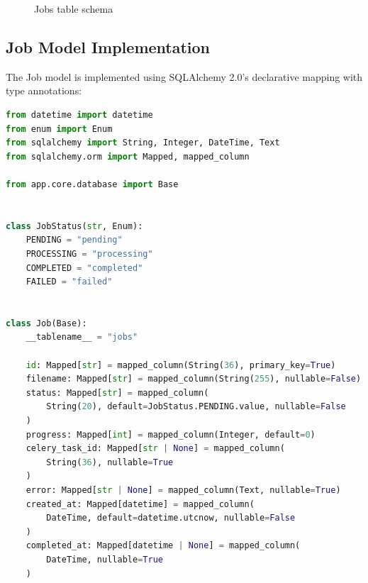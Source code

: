 \begin{figure}[H]
\centering
{}
\caption{Jobs table schema}
\label{fig:db-schema}
\end{figure}

\subsection{Job Model Implementation}

The Job model is implemented using SQLAlchemy 2.0's declarative mapping with type annotations:

\begin{lstlisting}[language=Python, caption={Job model definition (app/models/job.py)}]
from datetime import datetime
from enum import Enum
from sqlalchemy import String, Integer, DateTime, Text
from sqlalchemy.orm import Mapped, mapped_column

from app.core.database import Base


class JobStatus(str, Enum):
    PENDING = "pending"
    PROCESSING = "processing"
    COMPLETED = "completed"
    FAILED = "failed"


class Job(Base):
    __tablename__ = "jobs"

    id: Mapped[str] = mapped_column(String(36), primary_key=True)
    filename: Mapped[str] = mapped_column(String(255), nullable=False)
    status: Mapped[str] = mapped_column(
        String(20), default=JobStatus.PENDING.value, nullable=False
    )
    progress: Mapped[int] = mapped_column(Integer, default=0)
    celery_task_id: Mapped[str | None] = mapped_column(
        String(36), nullable=True
    )
    error: Mapped[str | None] = mapped_column(Text, nullable=True)
    created_at: Mapped[datetime] = mapped_column(
        DateTime, default=datetime.utcnow, nullable=False
    )
    completed_at: Mapped[datetime | None] = mapped_column(
        DateTime, nullable=True
    )
\end{lstlisting}

